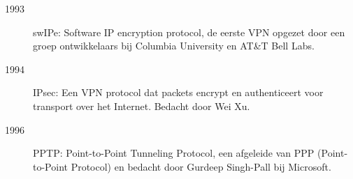 \begin{description}
\item[1993] swIPe: Software IP encryption protocol, de eerste VPN opgezet door een groep ontwikkelaars bij Columbia University en AT\&T Bell Labs.
\item[1994] IPsec: Een VPN protocol dat packets encrypt en authenticeert voor transport over het Internet. Bedacht door Wei Xu.
\item[1996] PPTP: Point-to-Point Tunneling Protocol, een afgeleide van PPP (Point-to-Point Protocol) en bedacht door Gurdeep Singh-Pall bij Microsoft.
\end{description}
